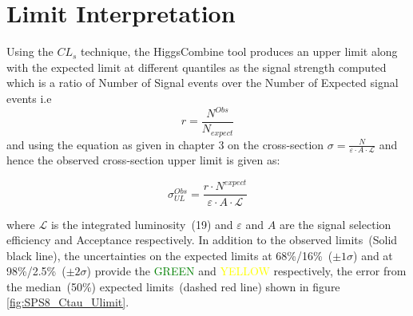 \chapter{Limit Interpretation}
\label{Limit_Results_and_Intepretation_Chapter}

Using the $CL_{s}$ technique, the HiggsCombine tool produces an upper limit along with the expected limit at different quantiles as the signal strength computed which is a ratio of Number of Signal events over the Number of Expected signal events i.e
\begin{equation}
 r = \frac {N^{Obs}}{N_{expect}}
\end{equation}
and using the equation as given in chapter 3 on the cross-section $\sigma = \frac{N}{\varepsilon\cdot A \cdot \mathscr{L}}$ and hence the observed cross-section upper limit is given as:

\begin{equation}
\sigma^{Obs}_{UL} = \frac{r\cdot N^{expect}}{\varepsilon\cdot A\cdot \mathscr{L}}
\end{equation}

where $\mathscr{L}$ is the integrated luminosity~(19\fbinv) and $\varepsilon$ and $A$ are the signal selection efficiency and Acceptance respectively.
In addition to the observed limits~(Solid black line), the uncertainties on the expected limits at 68\%/16\%~($\pm 1\sigma$) and at 98\%/2.5\%~($\pm 2\sigma$) provide the \textcolor{green}{GREEN} and \textcolor{yellow}{YELLOW} respectively, the error from the median~(50\%) expected limits~(dashed red line) shown in figure \ref{fig:SPS8_Ctau_Ulimit}.



